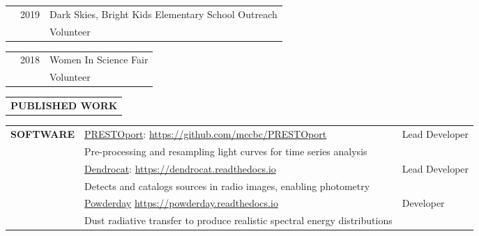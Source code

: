\documentclass{article}
\begin{document}
\vspace{0.25cm}
\begin{tabular}{p{4cm}p{2.2cm}l}
    &2019 & Dark Skies, Bright Kids Elementary School Outreach \\
    &             & \small Volunteer
\end{tabular}


\vspace{0.25cm}
\begin{tabular}{p{4cm}p{2.2cm}l}
    &2018 & Women In Science Fair \\
    &             & \small Volunteer
\end{tabular}
\vspace{0.5cm}

\renewcommand\refname{\vskip -1cm}
\nocite{*}


\begin{tabular}{p{4cm}}
   \large{\textbf{PUBLISHED WORK}} \vspace{-0.45cm}\\
\end{tabular}

\hspace{4.6cm}\begin{minipage}{\dimexpr\textwidth-5.2cm}

\xdef\tpd{\the\prevdepth}
\end{minipage}
\vspace{0.5cm}


\thispagestyle{empty}


\begin{tabular}{p{4cm}ll}
    \large{\textbf{SOFTWARE}} &\href{https://github.com/mccbc/PRESTOport}{PRESTOport}: \href{https://github.com/mccbc/PRESTOport}{https://github.com/mccbc/PRESTOport} &  Lead Developer\\
    &\small Pre-processing and resampling light curves for time series analysis & \vspace{0.25cm} \\
    &\href{https://github.com/cmcclellan1010/dendrocat
}{Dendrocat}: \href{https://dendrocat.readthedocs.io}{https://dendrocat.readthedocs.io} & Lead Developer \\
    &\small Detects and catalogs sources in radio images, enabling photometry & \vspace{0.25cm} \\
    &\href{https://powderday.readthedocs.io/en/latest/index.html}{Powderday} \href{https://powderday.readthedocs.io/en/latest/index.html}{https://powderday.readthedocs.io} & Developer \\ 
    &\small Dust radiative transfer to produce realistic spectral energy distributions & \\
\end{tabular}
\vspace{0.5cm}
\end{document}
